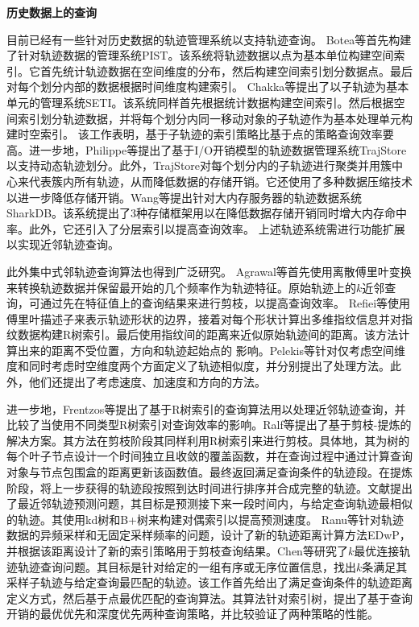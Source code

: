 \textbf{历史数据上的查询}

目前已经有一些针对历史数据的轨迹管理系统以支持轨迹查询\cite{BoteaMNS08,ChakkaEP03,Cudre-MaurouxWM10}。
Botea等首先构建了针对轨迹数据的管理系统PIST\cite{BoteaMNS08}。该系统将轨迹数据以点为基本单位构建空间索引。它首先统计轨迹数据在空间维度的分布，然后构建空间索引划分数据点。最后对每个划分内部的数据根据时间维度构建索引。
Chakka等提出了以子轨迹为基本单元的管理系统SETI\cite{ChakkaEP03}。该系统同样首先根据统计数据构建空间索引。然后根据空间索引划分轨迹数据，并将每个划分内同一移动对象的子轨迹作为基本处理单元构建时空索引。
该工作表明，基于子轨迹的索引策略比基于点的策略查询效率要高。进一步地，Philippe等提出了基于I/O开销模型的轨迹数据管理系统TrajStore以支持动态轨迹划分\cite{Cudre-MaurouxWM10}。此外，TrajStore对每个划分内的子轨迹进行聚类并用簇中心来代表簇内所有轨迹，从而降低数据的存储开销。它还使用了多种数据压缩技术以进一步降低存储开销。Wang等提出针对大内存服务器的轨迹数据系统SharkDB\cite{WangZZS15,WangZXZZS14,ZhengWZSLS18}。该系统提出了3种存储框架用以在降低数据存储开销同时增大内存命中率。此外，它还引入了分层索引以提高查询效率。
上述轨迹系统需进行功能扩展以实现近邻轨迹查询。

此外集中式邻轨迹查询算法也得到广泛研究。
Agrawal等首先使用离散傅里叶变换来转换轨迹数据并保留最开始的几个频率作为轨迹特征\cite{AgrawalFS93}。原始轨迹上的$k$近邻查询，可通过先在特征值上的查询结果来进行剪枝，以提高查询效率。
Refiei等使用傅里叶描述子来表示轨迹形状的边界，接着对每个形状计算出多维指纹信息并对指纹数据构建R树索引\cite{RafieiM02}。最后使用指纹间的距离来近似原始轨迹间的距离。该方法计算出来的距离不受位置，方向和轨迹起始点的 影响。Pelekis等针对仅考虑空间维度和同时考虑时空维度两个方面定义了轨迹相似度，并分别提出了处理方法\cite{Pelekis}。此外，他们还提出了考虑速度、加速度和方向的方法。

进一步地，Frentzos等提出了基于R树索引的查询算法用以处理近邻轨迹查询，并比较了当使用不同类型R树索引对查询效率的影响\cite{FrentzosGPT07}。Ralf等提出了基于剪枝-提炼的解决方案\cite{GutingBX10}。其方法在剪枝阶段其同样利用R树索引来进行剪枝。具体地，其为树的每个叶子节点设计一个时间独立且收敛的覆盖函数，并在查询过程中通过计算查询对象与节点包围盒的距离更新该函数值。最终返回满足查询条件的轨迹段。在提炼阶段，将上一步获得的轨迹段按照到达时间进行排序并合成完整的轨迹。文献\cite{KolliosGT99}提出了最近邻轨迹预测问题，其目标是预测接下来一段时间内，与给定查询轨迹最相似的轨迹。其使用kd树和B+树来构建对偶索引以提高预测速度。
Ranu等针对轨迹数据的异频采样和无固定采样频率的问题，设计了新的轨迹距离计算方法EDwP，并根据该距离设计了新的索引策略用于剪枝查询结果\cite{RanuPTDR15}。Chen等研究了$k$最优连接轨迹轨迹查询问题\cite{ChenSZZX10}。其目标是针对给定的一组有序或无序位置信息，找出$k$条满足其采样子轨迹与给定查询最匹配的轨迹。该工作首先给出了满足查询条件的轨迹距离定义方式，然后基于点最优匹配的查询算法。其算法针对索引树，提出了基于查询开销的最优优先和深度优先两种查询策略，并比较验证了两种策略的性能。

